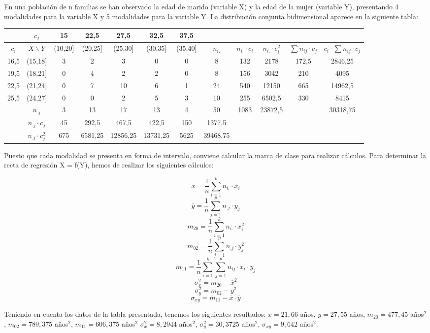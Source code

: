 \documentclass{article}
\begin{document}
En una población de n familias se han observado la edad de marido (variable X) y la edad de la mujer (variable Y), presentando 4 modalidades para la variable X y 5 modalidades para la variable Y. La distribución conjunta bidimensional aparece en la siguiente tabla:

\tiny
	\begin{center}
		\begin{tabular}{ c|c|c c c c c|c c c c c|}
			
			& $c_j$  & 15 & 22,5 & 27,5 & 32,5 & 37,5 &  &  &  &  &  \\ \hline
			$c_i$ & $X \backslash Y$ & (10,20] & (20,25] & (25,30] & (30,35] & (35,40] & $n_{i.}$  & $n_{i.}·c_i$  &  $n_{i.}·c_i^2$ & $\sum n_{ij}·c_j$  & $c_i·\sum n_{ij}·c_j$ \\ \hline
			16,5 & (15,18] & 3 & 2 & 3 & 0 & 0 & 8 & 132 & 2178 & 172,5 & 2846,25 \\ 
			19,5 & (18,21] & 0 & 4 & 2 & 2 & 0 & 8 & 156 & 3042 & 210 & 4095 \\ 
			22,5 & (21,24] & 0 & 7 & 10 & 6 & 1 & 24 & 540 & 12150 & 665 & 14962,5 \\ 
			25,5 & (24,27] & 0 & 0 & 2 & 5 & 3 & 10 & 255 & 6502,5 & 330 & 8415 \\ \hline
			& $n_{.j}$ & 3 & 13 & 17 & 13 & 4 & 50 & 1083 & 23872,5 &  & 30318,75 \\ 
			& $n_{.j}·c_j$ & 45 & 292,5 & 467,5 & 422,5 & 150 & 1377,5 &  &  &  &  \\ 
			& $n_{.j}·c_j^2$ & 675 & 6581,25 & 12856,25 & 13731,25 & 5625 & 39468,75 &  &  &  &  
		\end{tabular}
	\end{center}

\normalsize

Puesto que cada modalidad se presenta en forma de intervalo, conviene calcular la marca de clase para realizar cálculos. Para determinar la recta de regresión X = f(Y), hemos de realizar los siguientes cálculos:
	
	$$\overline{x} = \frac{1}{n}\sum_{i=1}^{k}n_{i.}·x_i$$
	$$\overline{y} = \frac{1}{n}\sum_{j=1}^{p}n_{.j}·y_j$$
	$$m_{20} = \frac{1}{n}\sum_{i=1}^{k}n_{i.}·x_i^2$$
	$$m_{02} = \frac{1}{n}\sum_{j=1}^{p}n_{.j}·y_j^2$$
	$$m_{11} = \frac{1}{n}\sum_{i=1}^{k}\sum_{j=1}^{p}n_{ij}·x_i·y_j$$
	$$ \sigma_x^2 = m_{20} - \overline{x}^2$$
	$$ \sigma_y^2 = m_{02} - \overline{y}^2$$
	$$ \sigma_{xy} = m_{11} - \overline{x}·\overline{y}$$
	
Teniendo en cuenta los datos de la tabla presentada, tenemos los siguientes resultados: $\overline{x} = 21,66$ años, $\overline{y} = 27,55$ años, $m_{20} = 477,45$ años$^2$, $m_{02} = 789,375$ años$^2$, $m_{11} = 606,375$ años$^2$ $ \sigma_x^2 = 8,2944$ años$^2$, $ \sigma_y^2 = 30,3725$ años$^2$, $ \sigma_{xy} =9,642$ años$^2$.
	
\end{document}
